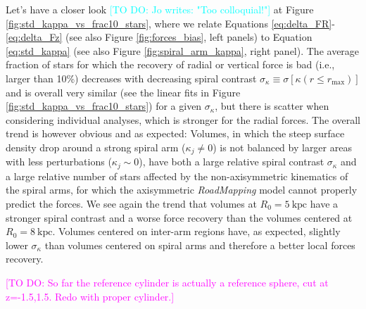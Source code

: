 \documentclass[iop,revtex4,numberedappendix,appendixfloats]{emulateapj}
\newcommand{\RM}{{\sl RoadMapping}}
\newcommand{\Wilma}[1]{\textcolor{Magenta}{#1}}
\newcommand{\Jo}[1]{\textcolor{Cyan}{#1}}
\begin{document}
Let's have a closer look \Jo{[TO DO: Jo writes: "Too colloquial!"]} at Figure \ref{fig:std_kappa_vs_frac10_stars}, where we relate Equations \eqref{eq:delta_FR}-\eqref{eq:delta_Fz} (see also Figure \ref{fig:forces_bias}, left panels) to Equation \eqref{eq:std_kappa} (see also Figure \ref{fig:spiral_arm_kappa}, right panel). The average fraction of stars for which the recovery of radial or vertical force is bad (i.e., larger than 10\%) decreases with decreasing spiral contrast $\sigma_\kappa \equiv \sigma[\kappa(r \leq r_\text{max})]$ and is overall very similar (see the linear fits in Figure \ref{fig:std_kappa_vs_frac10_stars}) for a given $\sigma_\kappa$, but there is scatter when considering individual analyses, which is stronger for the radial forces. The overall trend is however obvious and as expected: Volumes, in which the steep surface density drop around a strong spiral arm ($\kappa_j \neq 0$) is not balanced by larger areas with less perturbations ($\kappa_j \sim 0$), have both a large relative spiral contrast $\sigma_\kappa$ and a large relative number of stars affected by the non-axisymmetric kinematics of the spiral arms, for which the axisymmetric \RM{} model cannot properly predict the forces. We see again the trend that volumes at $R_0=5~\text{kpc}$ have a stronger spiral contrast and a worse force recovery than the volumes centered at $R_0=8~\text{kpc}$. Volumes centered on inter-arm regions have, as expected, slightly lower $\sigma_\kappa$ than volumes centered on spiral arms and therefore a better local forces recovery.

\Wilma{[TO DO: So far the reference cylinder is actually a reference sphere, cut at z=-1.5,1.5. Redo with proper cylinder.]}
\end{document}
